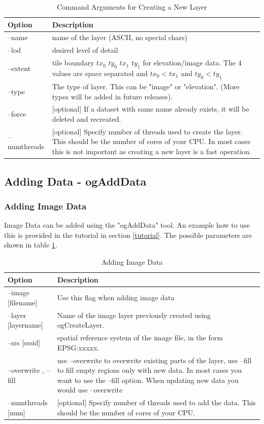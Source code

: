 \documentclass[
	12pt,
	a4paper,
	english,	
	appendixprefix,				     			        
	openany,		     	
	abstracton,		    		    
 	BCOR8mm,		    
]{scrartcl}
\begin{document}
\begin{table}[H]
\centering
\begin{tabular}{|l|p{6cm}|}
\hline
\textbf{Option}	& \textbf{Description}\\
\hline
--name   & name of the layer (ASCII, no special chars)\\
\hline
--lod & desired level of detail\\
\hline
--extent & tile boundary $tx_0$ $ty_0$ $tx_1$ $ty_1$ for elevation/image data. The 4 values are space separated and $tx_0<tx_1$ and $ty_0<ty_1$ \\
\hline
--type & The type of layer. This can be "image" or "elevation". (More types will be added in future releases).\\ 
\hline
--force   & [optional] If a dataset with same name already exists, it will be deleted and recreated.\\
\hline
--numthreads & [optional] Specify number of threads used to create the layer. This should be the number of cores of your CPU. In most cases this is not important as creating a new layer is a fast operation.\\
\hline
\end{tabular}
\caption{Command Arguments for Creating a New Layer}
\end{table}

\subsection{Adding Data - ogAddData}\label{ogAddData}

\subsubsection{Adding Image Data}

Image Data can be added using the "ogAddData" tool. An example how to use this is provided in the tutorial in section \ref{tutorial}.
The possible parameters are shown in table \ref{tableaddimage}.

\begin{table}[H]
\centering
\begin{tabular}{|l|p{6cm}|}
\hline
\textbf{Option}	& \textbf{Description}\\
\hline
--image [filename]   & Use this flag when adding image data\\
\hline
--layer [layername]   & Name of the image layer previously created using ogCreateLayer.\\
\hline
--srs [srsid] & spatial reference system of the image file, in the form EPSG:xxxxx.\\
\hline
--overwrite , --fill   &  use --overwrite to overwrite existing parts of the layer, use --fill to fill empty regions only with new data. In most cases you want to use the --fill option. When updating new data you would use --overwrite\\
\hline
--numthreads [num] & [optional] Specify number of threads used to add the data. This should be the number of cores of your CPU.\\
\hline
\end{tabular}
\caption{Adding Image Data}\label{tableaddimage}
\end{table}
\end{document}
